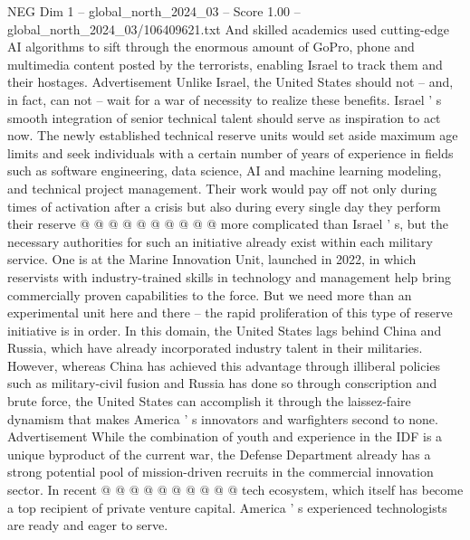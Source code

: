 \begin{textsample}{NEG Dim 1 – global\_north\_2024\_03 – Score 1.00 – global\_north\_2024\_03/106409621.txt}
And skilled academics used cutting-edge AI algorithms to sift through the enormous amount of GoPro, phone and multimedia content posted by the terrorists, enabling Israel to track them and their hostages.
Advertisement Unlike Israel, the United States should not -- and, in fact, can not -- wait for a war of necessity to realize these benefits.
Israel ' s smooth integration of senior technical talent should serve as inspiration to act now.
The newly established technical reserve units would set aside maximum age limits and seek individuals with a certain number of years of experience in fields such as software engineering, data science, AI and machine learning modeling, and technical project management.
Their work would pay off not only during times of activation after a crisis but also during every single day they perform their reserve @ @ @ @ @ @ @ @ @ @ more complicated than Israel ' s, but the necessary authorities for such an initiative already exist within each military service.
One is at the Marine Innovation Unit, launched in 2022, in which reservists with industry-trained skills in technology and management help bring commercially proven capabilities to the force.
But we need more than an experimental unit here and there -- the rapid proliferation of this type of reserve initiative is in order.
In this domain, the United States lags behind China and Russia, which have already incorporated industry talent in their militaries.
However, whereas China has achieved this advantage through illiberal policies such as military-civil fusion and Russia has done so through conscription and brute force, the United States can accomplish it through the laissez-faire dynamism that makes America ' s innovators and warfighters second to none.
Advertisement While the combination of youth and experience in the IDF is a unique byproduct of the current war, the Defense Department already has a strong potential pool of mission-driven recruits in the commercial innovation sector.
In recent @ @ @ @ @ @ @ @ @ @ tech ecosystem, which itself has become a top recipient of private venture capital.
America ' s experienced technologists are ready and eager to serve.

\end{textsample}
